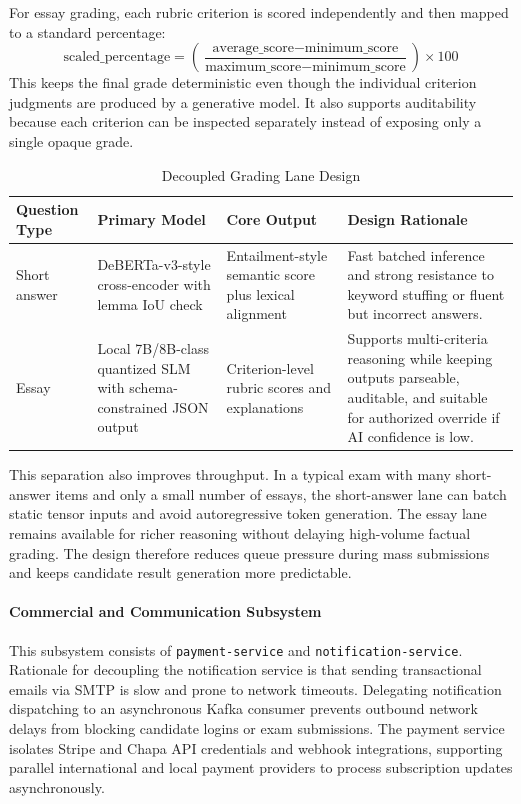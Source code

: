 For essay grading, each rubric criterion is scored independently and then mapped to a standard percentage:
\[
\text{scaled\_percentage} =
\left(
\frac{\text{average\_score} - \text{minimum\_score}}
{\text{maximum\_score} - \text{minimum\_score}}
\right) \times 100
\]
This keeps the final grade deterministic even though the individual criterion judgments are produced by a generative model. It also supports auditability because each criterion can be inspected separately instead of exposing only a single opaque grade.

\begin{table}[H]
\centering
\caption{Decoupled Grading Lane Design}
\label{tab:decoupled-grading-lanes}
\renewcommand{\arraystretch}{1.25}
\setlength{\tabcolsep}{4pt}
\begin{tabular}{|p{3.1cm}|p{4.0cm}|p{3.2cm}|p{3.4cm}|}
\hline
\textbf{Question Type} & \textbf{Primary Model} & \textbf{Core Output} & \textbf{Design Rationale} \\ \hline
Short answer & DeBERTa-v3-style cross-encoder with lemma IoU check & Entailment-style semantic score plus lexical alignment & Fast batched inference and strong resistance to keyword stuffing or fluent but incorrect answers. \\ \hline
Essay & Local 7B/8B-class quantized SLM with schema-constrained JSON output & Criterion-level rubric scores and explanations & Supports multi-criteria reasoning while keeping outputs parseable, auditable, and suitable for authorized override if AI confidence is low. \\ \hline
\end{tabular}
\end{table}

This separation also improves throughput. In a typical exam with many short-answer items and only a small number of essays, the short-answer lane can batch static tensor inputs and avoid autoregressive token generation. The essay lane remains available for richer reasoning without delaying high-volume factual grading. The design therefore reduces queue pressure during mass submissions and keeps candidate result generation more predictable.

\paragraph{Commercial and Communication Subsystem}
This subsystem consists of \texttt{payment-service} and \texttt{notification-service}. Rationale for decoupling the notification service is that sending transactional emails via SMTP is slow and prone to network timeouts. Delegating notification dispatching to an asynchronous Kafka consumer prevents outbound network delays from blocking candidate logins or exam submissions. The payment service isolates Stripe and Chapa API credentials and webhook integrations, supporting parallel international and local payment providers to process subscription updates asynchronously.

